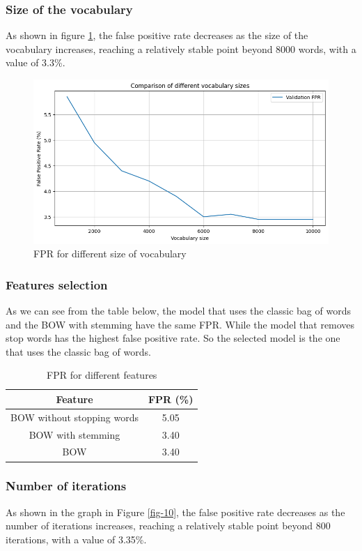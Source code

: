 \documentclass{class}
\begin{document}
\subsubsection*{Size of the vocabulary}
As shown in figure \ref{fig-9}, the false positive rate decreases as the size of the vocabulary increases,
reaching a relatively stable point beyond 8000 words, with a value of 3.3\%.
\begin{figure}[h]
    \centering
    \includegraphics[width=0.7\columnwidth]{images/fpr_logreg_voc_size.png}
    \caption{FPR for different size of vocabulary}
    \label{fig-9}
\end{figure}
\subsubsection*{Features selection}
As we can see from the table below, the model that uses the classic bag of words and the BOW with stemming have the same FPR.
While the model that removes stop words has the highest false positive rate.
So the selected model is the one that uses the classic bag of words.
\begin{table}[H]
    \centering
    \begin{tabular}{|c|c|}
        \hline
        Feature                    & FPR (\%) \\
        \hline
        BOW without stopping words & 5.05     \\
        BOW with stemming          & 3.40     \\
        BOW                        & 3.40     \\
        \hline
    \end{tabular}
    \caption{FPR for different features}
    \label{tab-2}
\end{table}

\subsubsection*{Number of iterations}
As shown in the graph in Figure \ref{fig-10}, the false positive rate decreases as the number of iterations increases,
reaching a relatively stable point beyond 800 iterations, with a value of 3.35\%.
\end{document}
